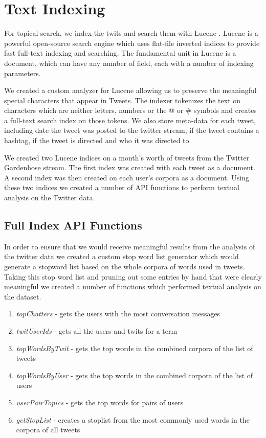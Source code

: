 \section{Text Indexing}

For topical search, we index the twits and search them with Lucene \cite{Lucene}.
Lucene is a powerful open-source search engine which uses flat-file inverted indices to provide fast full-text indexing and searching.  The fundamental unit in Lucene is a document, which can have any number of field, each with a number of indexing parameters.

We created a custom analyzer for Lucene allowing us to preserve the meaningful special characters that appear in Tweets.  The indexer tokenizes the text on characters which are neither letters, numbers or the @ or \# symbols and creates a full-text search index on those tokens.  We also store meta-data for each tweet, including date the tweet was posted to the twitter stream, if the tweet contains a hashtag, if the tweet is directed and who it was directed to.

We created two Lucene indices on a month's worth of tweets from the Twitter Gardenhose stream.  The first index was created with each tweet as a document.  A second index was then created on each user's corpora as a document.  Using these two indices we created a number of API functions to perform textual analysis on the Twitter data.

\subsection{Full Index API Functions}

In order to ensure that we would receive meaningful results from the analysis of the twitter data we created a custom stop word list generator which would generate a stopword list based on the whole corpora of words used in tweets.  Taking this stop word list and pruning out some entries by hand that were clearly meaningful we created a number of functions which performed textual analysis on the dataset.

\begin{enumerate}
\item \emph{topChatters} - gets the users with the most conversation messages
\item \emph{twitUserIds} - gets all the users and twits for a term
\item \emph{topWordsByTwit} - gets the top words in the combined corpora of the list of tweets
\item \emph{topWordsByUser} - gets the top words in the combined corpora of the list of users
\item \emph{userPairTopics} - gets the top words for pairs of users
\item \emph{getStopList} - creates a stoplist from the most commonly used words in the corpora of all tweets
\end{enumerate}

